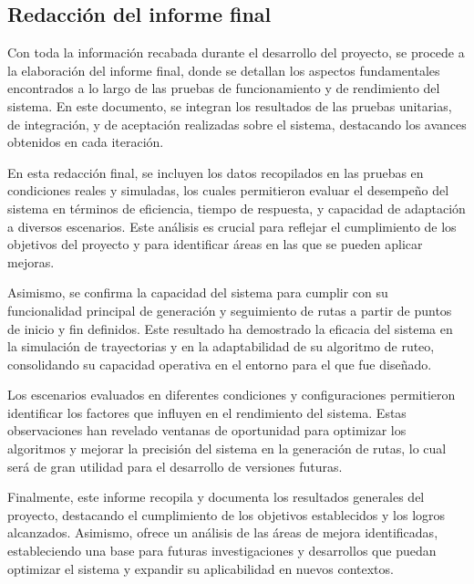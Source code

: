 \subsection{Redacci\'on del informe final} %

    Con toda la informaci\'on recabada durante el desarrollo del proyecto, 
        se procede a la elaboraci\'on del informe final, donde se detallan 
        los aspectos fundamentales encontrados a lo largo de las pruebas 
        de funcionamiento y de rendimiento del sistema. En este documento, 
        se integran los resultados de las pruebas unitarias, de integraci\'on, 
        y de aceptaci\'on realizadas sobre el sistema, destacando los avances 
        obtenidos en cada iteraci\'on.

    \vskip 0.5cm

    En esta redacci\'on final, se incluyen los datos recopilados en las pruebas en condiciones 
        reales y simuladas, los cuales permitieron evaluar el desempe\~no del sistema en t\'erminos 
        de eficiencia, tiempo de respuesta, y capacidad de adaptaci\'on a diversos escenarios. 
        Este an\'alisis es crucial para reflejar el cumplimiento de los objetivos del proyecto y 
        para identificar \'areas en las que se pueden aplicar mejoras.

    \vskip 0.5cm

    Asimismo, se confirma la capacidad del sistema para cumplir con su funcionalidad principal 
        de generaci\'on y seguimiento de rutas a partir de puntos de inicio y fin definidos. 
        Este resultado ha demostrado la eficacia del sistema en la simulaci\'on de trayectorias 
        y en la adaptabilidad de su algoritmo de ruteo, consolidando su capacidad operativa en 
        el entorno para el que fue dise\~nado.

    \vskip 0.5cm

    Los escenarios evaluados en diferentes condiciones y configuraciones permitieron identificar 
        los factores que influyen en el rendimiento del sistema. Estas observaciones han revelado 
        ventanas de oportunidad para optimizar los algoritmos y mejorar la precisi\'on del sistema 
        en la generaci\'on de rutas, lo cual ser\'a de gran utilidad para el desarrollo de versiones futuras.

    \vskip 0.5cm

    Finalmente, este informe recopila y documenta los resultados generales del proyecto, 
        destacando el cumplimiento de los objetivos establecidos y los logros alcanzados. 
        Asimismo, ofrece un an\'alisis de las \'areas de mejora identificadas, estableciendo 
        una base para futuras investigaciones y desarrollos que puedan optimizar el sistema y 
        expandir su aplicabilidad en nuevos contextos.
    \vskip 0.5cm

